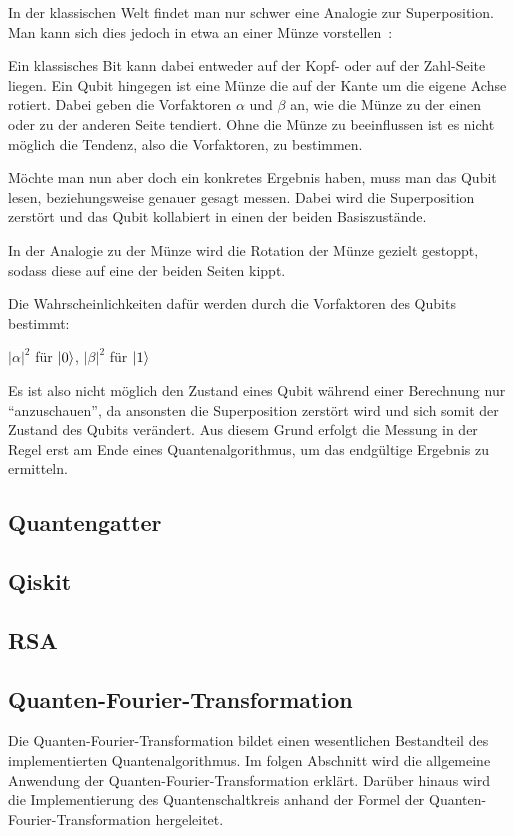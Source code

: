 In der klassischen Welt findet man nur schwer eine Analogie zur Superposition. 
Man kann sich dies jedoch in etwa an einer Münze vorstellen~\cite{Hoever2023Münze}:

Ein klassisches Bit kann dabei entweder auf der Kopf- oder auf der Zahl-Seite liegen.
Ein Qubit hingegen ist eine Münze die auf der Kante um die eigene Achse rotiert.
Dabei geben die Vorfaktoren \(\alpha\) und \(\beta\) an,
wie die Münze zu der einen oder zu der anderen Seite tendiert.
Ohne die Münze zu beeinflussen ist es nicht möglich die Tendenz, 
also die Vorfaktoren, zu bestimmen.

Möchte man nun aber doch ein konkretes Ergebnis haben, 
muss man das Qubit lesen, 
beziehungsweise genauer gesagt messen.
Dabei wird die Superposition zerstört und das Qubit kollabiert in einen der beiden Basiszustände.

In der Analogie zu der Münze wird die Rotation der Münze gezielt gestoppt, sodass diese auf eine der beiden Seiten kippt.

Die Wahrscheinlichkeiten dafür werden durch die Vorfaktoren des Qubits bestimmt:
\begin{center}
\(\lvert\alpha\rvert^2\) für \(\ket{0}\), \(\lvert\beta\rvert^2\) für \(\ket{1}\)
\end{center}

Es ist also nicht möglich den Zustand eines Qubit während einer Berechnung nur "`anzuschauen"',
da ansonsten die Superposition zerstört wird und sich somit der Zustand des Qubits verändert.
Aus diesem Grund erfolgt die Messung in der Regel erst am Ende eines Quantenalgorithmus, um das endgültige Ergebnis zu ermitteln.

\subsection{Quantengatter}

\subsection{Qiskit}
\subsection{RSA}

\subsection{Quanten-Fourier-Transformation}
Die Quanten-Fourier-Transformation bildet einen wesentlichen Bestandteil des implementierten Quantenalgorithmus. 
Im folgen Abschnitt wird die allgemeine Anwendung der Quanten-Fourier-Transformation erklärt.
Darüber hinaus wird die Implementierung des Quantenschaltkreis anhand der Formel der Quanten-Fourier-Transformation hergeleitet.

